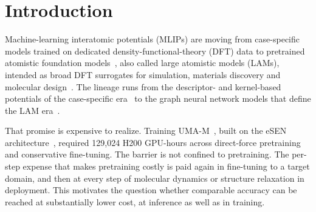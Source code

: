 \section{Introduction}

Machine-learning interatomic potentials (MLIPs) are moving from case-specific models trained on dedicated density-functional-theory (DFT) data to pretrained atomistic foundation models~\cite{yuan2026foundation}, also called large atomistic models (LAMs), intended as broad DFT surrogates for simulation, materials discovery and molecular design~\cite{merchant2023scaling}.
The lineage runs from the descriptor- and kernel-based potentials of the case-specific era~\cite{behler2007generalized,bartok2010gaussian,schutt2017schnet,unke2019physnet,zhang2018deep,wang2018deepmd} to the graph neural network models that define the LAM era~\cite{chen2022universal,deng2023chgnet,batatia2022mace,kovacs2023mace,yang2024mattersim,neumann2024orb,rhodes2025orbv3,liao2023equiformerv2,liao2026equiformerv3,wood2025umafamilyuniversalmodels,zhang2024dpa2,zhang2025dpa3}.

That promise is expensive to realize.
Training UMA-M~\cite{wood2025umafamilyuniversalmodels}, built on the eSEN architecture~\cite{fu2025esen}, required 129{,}024 H200 GPU-hours across direct-force pretraining and conservative fine-tuning.
The barrier is not confined to pretraining.
The per-step expense that makes pretraining costly is paid again in fine-tuning to a target domain, and then at every step of molecular dynamics or structure relaxation in deployment.
This motivates the question whether comparable accuracy can be reached at substantially lower cost, at inference as well as in training.

